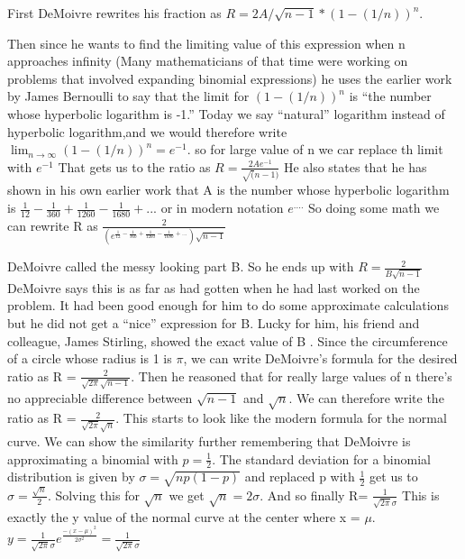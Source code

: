 \documentclass{article}
\begin{document}
First DeMoivre rewrites his fraction as   $ R= 2A/ \sqrt{n-1} * (1-(1/n))^{n} $.

Then since he wants to find the limiting value of this expression when n approaches infinity (Many mathematicians of that time were working on problems that involved expanding binomial expressions) he uses the earlier work by James Bernoulli to say that the limit for $ (1-(1/n))^{n} $ is “the number
whose hyperbolic logarithm is -1.” Today we say “natural” logarithm instead of hyperbolic logarithm,and we would therefore write $ \lim_{n\to\infty}  (1-(1/n))^{n}  = e^{-1}  $.
so for large value of n we car replace th limit with $ e^{-1} $
That gets us to the ratio as $ R=  \frac {2Ae^{-1}}{\sqrt(n-1)} $
He also states that he has shown in his own earlier work that A is the number whose hyperbolic logarithm is $ \frac{1}{12} - \frac{1}{360} + \frac{1}{1260} - \frac{1}{1680} + ...  $  or in modern notation $ e^{....} $
So doing some math we can rewrite R as $ \frac{2}{(e^{ \frac{1}{12} - \frac{1}{360} + \frac{1}{1260} - \frac{1}{1680} + ... }) \sqrt{n-1}  } $

DeMoivre called the messy looking part B. So he ends up with $ R= \frac{2}{B \sqrt{n-1}} $
DeMoivre says this is as far as had gotten when he had last worked on the problem.
It had been good enough for him to do some approximate calculations but he did not get a “nice” expression for B.
Lucky for him, his friend and colleague, James Stirling, showed the exact value of B \cite{fd7a87fc9eff4e9c9ce8b351cb000eb8}.
Since the circumference of a circle whose radius is 1 is $ \pi $, we can write DeMoivre’s formula for the desired ratio as R = $ \frac{2}{ \sqrt{2\pi}\sqrt{n-1} } $.
Then he reasoned that for really large values of n there’s no appreciable difference between $ \sqrt{n-1} $ and  $ \sqrt{n}$.
We can therefore write the ratio as  R = $ \frac{2}{ \sqrt{2\pi}\sqrt{n} } $.
This starts to look like the modern formula for the normal curve.
We can show the similarity further remembering that DeMoivre is approximating a binomial with $ p= \frac{1}{2} $. The standard deviation for a binomial distribution is given by $ \sigma = \sqrt{np(1-p)} $ and replaced p with $ \frac{1}{2} $  get us to $ \sigma = \frac{ \sqrt{n}}{2} $.
Solving this for $ \sqrt{n}$ we get $ \sqrt{n}= 2\sigma $.
And so finally R= $ \frac{1}{\sqrt{2\pi}\sigma}$
This is exactly the y value of the normal curve at the center where x = $ \mu $.
$ y= \frac{1}{\sqrt{2\pi}\sigma }e^{{\frac{-(x-\mu)^{2}}{2\sigma^{2}}}}=  \frac{1}{\sqrt{2\pi}\sigma} $
\end{document}
